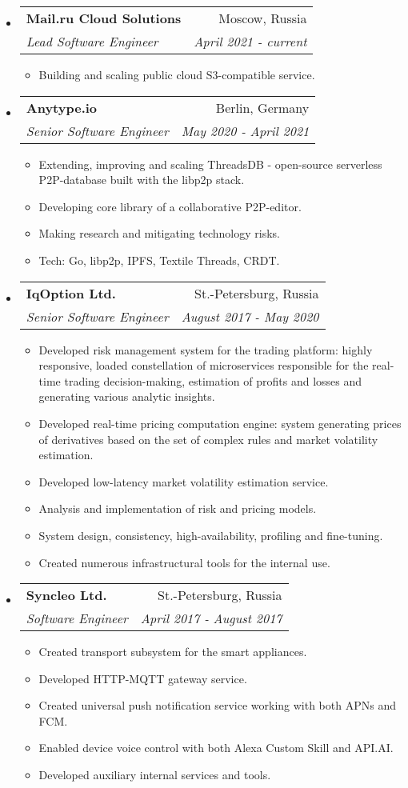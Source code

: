 \documentclass[letterpaper,11pt]{article}
\makeatletter
\newcommand{\resitem}[1]{\item #1 \vspace{-2pt}}
\newcommand{\ressubheading}[4]{
\begin{tabular*}{6.5in}{l@{\cftdotfill{\cftsecdotsep}\extracolsep{\fill}}r}
		\textbf{#1} & #2 \\
		\textit{#3} & \textit{#4} \\
\end{tabular*}\vspace{-6pt}}
\makeatother
\begin{document}
\begin{itemize}

\item
	\ressubheading{Mail.ru Cloud Solutions}{Moscow, Russia}{Lead Software Engineer}{April 2021 - current}
	\begin{itemize}
		\resitem{Building and scaling public cloud S3-compatible service.}
	\end{itemize}

\item
	\ressubheading{Anytype.io}{Berlin, Germany}{Senior Software Engineer}{May 2020 - April 2021}
	\begin{itemize}
		\resitem{Extending, improving and scaling ThreadsDB - open-source serverless P2P-database built with the libp2p stack.}
		\resitem{Developing core library of a collaborative P2P-editor.}
		\resitem{Making research and mitigating technology risks.}
		\resitem{Tech: Go, libp2p, IPFS, Textile Threads, CRDT.}
	\end{itemize}

\item
	\ressubheading{IqOption Ltd.}{St.-Petersburg, Russia}{Senior Software Engineer}{August 2017 - May 2020}
	\begin{itemize}
		\resitem{Developed risk management system for the trading platform: highly responsive, loaded constellation of microservices responsible for the real-time trading decision-making, estimation of profits and losses and generating various analytic insights.}
		\resitem{Developed real-time pricing computation engine: system generating prices of derivatives based on the set of complex rules and market volatility estimation.}
		\resitem{Developed low-latency market volatility estimation service.}
		\resitem{Analysis and implementation of risk and pricing models.}
		\resitem{System design, consistency, high-availability, profiling and fine-tuning.}
		\resitem{Created numerous infrastructural tools for the internal use.}
	\end{itemize}

\item
	\ressubheading{Syncleo Ltd.}{St.-Petersburg, Russia}{Software Engineer}{April 2017 - August 2017}
	\begin{itemize}
		\resitem{Created transport subsystem for the smart appliances.}
		\resitem{Developed HTTP-MQTT gateway service.}
		\resitem{Created universal push notification service working with both APNs and FCM.}
		\resitem{Enabled device voice control with both Alexa Custom Skill and API.AI.}
		\resitem{Developed auxiliary internal services and tools.}
	\end{itemize}


\end{itemize}
\end{document}
